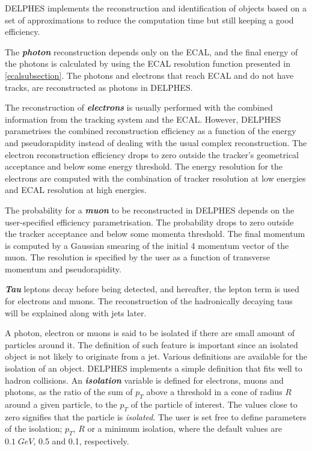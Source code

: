 {DELPHES implements the reconstruction and identification of objects based on a set of approximations to reduce the computation time but still keeping a good efficiency.

The \emph{\bf{photon}} reconstruction depends only on the ECAL, and the final energy of the photons is calculated by using the ECAL resolution function presented in \autoref{ecalsubsection}. The photons and electrons that reach ECAL and do not have tracks, are reconstructed as photons in DELPHES.

The reconstruction of \emph{\bf{electrons}} is usually performed with the combined information from the tracking system and the ECAL. However, DELPHES parametrises the combined reconstruction efficiency as a function of the energy and pseudorapidity instead of dealing with the usual complex reconstruction. The electron reconstruction efficiency drops to zero outside the tracker's geometrical acceptance and below some energy threshold. The energy resolution for the electrons are computed with the combination of tracker resolution at low energies and ECAL resolution at high energies.

The probability for a \emph{\bf{muon}} to be reconstructed in DELPHES depends on the user-specified efficiency parametrisation. The probability drops to zero outside the tracker acceptance and below some momenta threshold. The final momentum is computed by a Gaussian smearing of the initial 4 momentum vector of the muon. The resolution is specified by the user as a function of transverse momentum and pseudorapidity.

\emph{\bf{Tau}} leptons decay before being detected, and hereafter, the lepton term is used for electrons and muons. The reconstruction of the hadronically decaying taus will be explained along with jets later.

A photon, electron or muons is said to be isolated if there are small amount of particles around it. The definition of such feature is important since an isolated object is not likely to originate from a jet. Various definitions are available for the isolation of an object. DELPHES implements a simple definition that fits well to hadron collisions. An \emph{\bf{isolation}} variable is defined for electrons, muons and photons, as the ratio of the sum of $p_T$ above a threshold in a cone of radius $R$ around a given particle, to the $p_T$ of the particle of interest. The values close to zero signifies that the particle is \emph{isolated}. The user is set free to define parameters of the isolation; $p_T$, $R$ or a minimum isolation, where the default values are $0.1 \; GeV$, 0.5 and 0.1, respectively.

}

